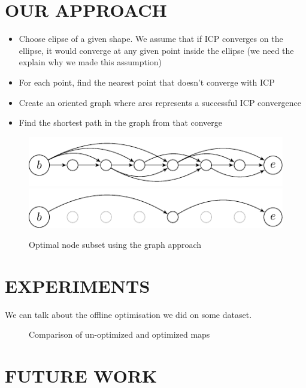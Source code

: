 \documentclass[letterpaper,10 pt,conference]{ieeeconf}
\begin{document}
\section{OUR APPROACH}
\label{approach}
\begin{itemize}
  \item Choose elipse of a given shape. We assume that if ICP converges on the
    ellipse, it would converge at any given point inside the ellipse (we need the explain why we made this assumption)

  \item For each point, find the nearest point that doesn't converge with ICP

  \item Create an oriented graph where arcs represents a successful ICP convergence

  \item Find the shortest path in the graph from that converge

\end{itemize}

\begin{figure}[thpb]
  \centering
  \includegraphics[scale=1.0]{img/unoptimized-graph.pdf}
  \includegraphics[scale=1.0]{img/optimized-graph.pdf}
  \caption{Optimal node subset using the graph approach}
\end{figure}


\section{EXPERIMENTS}
We can talk about the offline optimisation we did on some dataset.

\begin{figure}
  \caption{Comparison of un-optimized and optimized maps}
\end{figure}


\section{FUTURE WORK}
\end{document}

